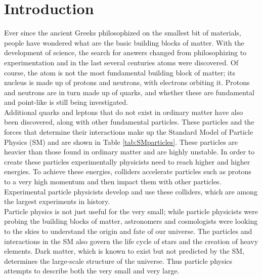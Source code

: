 \chapter{Introduction}
\label{ch:intro}



Ever since the ancient Greeks philosophized on the smallest bit of materials, people have wondered what are the basic building blocks of matter.  With the development of science, the search for answers changed from philosophizing to experimentation and in the last several centuries atoms were discovered.  Of course, the atom is not the most fundamental building block of matter; its nucleus is made up of protons and neutrons, with electrons orbiting it.  Protons and neutrons are in turn made up of quarks, and whether these are fundamental and point-like is still being investigated.  \\

Additional quarks and leptons that do not exist in ordinary matter have also been discovered, along with other fundamental particles.  These particles and the forces that determine their interactions make up the Standard Model of Particle Physics (SM) and are shown in Table \ref{tab:SMparticles}.  These particles are heavier than those found in ordinary matter and are highly unstable.  In order to create these particles experimentally physicists need to reach higher and higher energies.  To achieve these energies, colliders accelerate particles such as protons to a very high momentum and then impact them with other particles.  Experimental particle physicists develop and use these colliders, which are among the largest experiments in history.  \\

Particle physics is not just useful for the very small; while particle physicists were probing the building blocks of matter, astronomers and cosmologists were looking to the skies to understand the origin and fate of our universe.  The particles and interactions in the SM also govern the life cycle of stars and the creation of heavy elements.  Dark matter, which is known to exist but not predicted by the SM, determines the large-scale structure of the universe.  Thus particle physics attempts to describe both the very small and very large. \\

